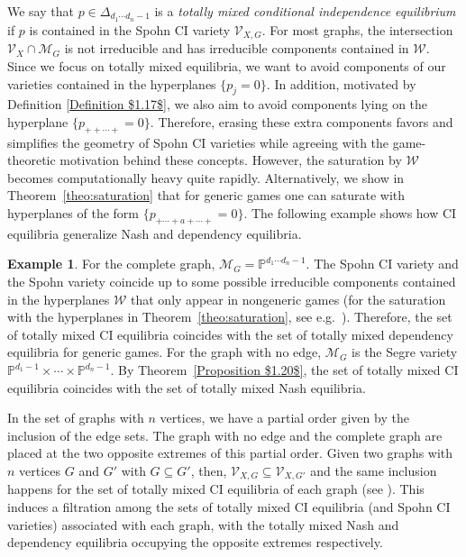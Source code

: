 \documentclass[11pt]{amsart}
\numberwithin{equation}{section}
\theoremstyle{plain}
\numberwithin{theorem}{section}
\theoremstyle{definition}
\newtheorem{example}[theorem]{Example}
\newcommand{\PP}{{\mathbb P}}
\begin{document}
We say that $p\in \Delta_{d_1 \cdots d_n -1}$ is a \textit{totally mixed conditional independence equilibrium} if $p$ is contained in the Spohn CI variety $\mathcal{V}_{X,G}$.
For most graphs, the intersection $\mathcal V_X\cap\mathcal M_G$ is not irreducible and has irreducible components contained in $\mathcal W$. Since we focus on totally mixed equilibria, we want to avoid components of our varieties contained in the hyperplanes $\{p_j=0\}$. In addition, motivated by Definition \ref{Definition $1.17$}, we also aim to avoid components lying on the hyperplane $\{ p_{++\cdots+}=0\}$. Therefore, erasing these extra components favors and simplifies the geometry of Spohn CI varieties while agreeing with the game-theoretic motivation behind these concepts. However,
the saturation by $\mathcal W$ becomes computationally heavy quite rapidly. 
Alternatively, we show in Theorem~\ref{theo:saturation} that for generic games one can saturate with hyperplanes of the form $\{p_{+\cdots+a+\cdots +}=0\}$. The following example shows how CI equilibria generalize Nash and dependency equilibria.

 

\begin{example}\label{ex: first CI equilibria}
For the complete graph, $\mathcal{M}_G=\PP^{d_1\cdots d_n-1}$. The Spohn CI variety and the Spohn variety coincide up to some possible irreducible components contained in the hyperplanes $\mathcal W$ that only appear in nongeneric games (for the saturation with the hyperplanes in Theorem~\ref{theo:saturation}, see e.g.\ \cite[Example 3.11]{portakal2024dependency}). Therefore, the set of totally mixed CI equilibria coincides with the set of totally mixed dependency equilibria for generic games. For the graph with no edge, $\mathcal{M}_G$ is the Segre variety $\PP^{d_1-1}\times \cdots \times \PP^{d_n-1}$. By Theorem~\ref{Proposition $1.20$}, the set of totally mixed CI equilibria coincides with the set of totally mixed Nash equilibria. 
\end{example}

In the set of graphs with $n$ vertices, we have a partial order given by the inclusion of the edge sets. The graph with no edge and the complete graph are placed at the two opposite extremes of this partial order. Given two graphs with $n$ vertices $G$ and $G'$ with $G\subseteq G'$, then, 
$\mathcal{V}_{X,G}\subseteq \mathcal{V}_{X,G'}$ and the same inclusion happens for the set of totally mixed CI equilibria of each graph (see \cite[Section 4]{portakal2024game}). This induces a filtration among the sets of totally mixed CI equilibria (and Spohn CI varieties) associated with each graph, with the totally mixed Nash and dependency equilibria occupying the opposite extremes respectively.
\end{document}
